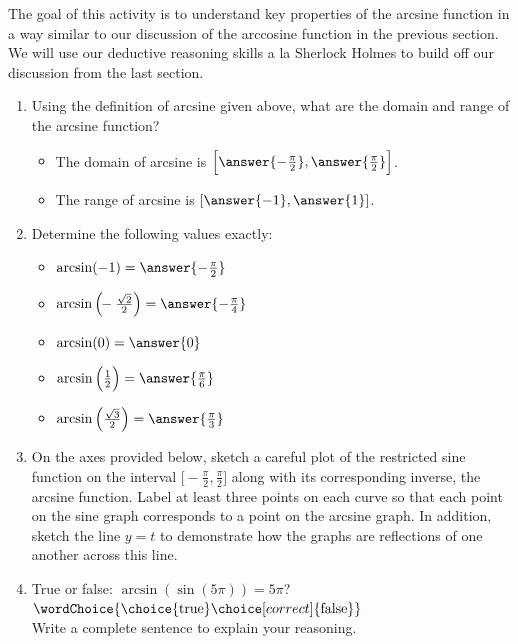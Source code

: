 \documentclass{ximera}
\begin{document}
\begin{problem}
The goal of this activity is to understand key properties of the arcsine function in a way similar to our discussion of the arccosine function in the previous section. We will use our deductive reasoning skills a la Sherlock Holmes to build off our discussion from the last section.%
\begin{enumerate}
\item
Using the definition of arcsine given above, what are the domain and range of the arcsine function? \\
\begin{itemize}
\item The domain of arcsine is $\Big[\answer{-\frac{\pi}{2}},\answer{\frac{\pi}{2}}\Big]$.
%
\item The range of arcsine is $[\answer{-1} , \answer{1}]$.
\end{itemize}
%
\item Determine the following values exactly: 
\begin{itemize}
\item $\arcsin(-1) = \answer{-\frac{\pi}{2}}$ 
%
\item $\arcsin\Big(\!\!-\frac{\sqrt{2}}{2}\Big) = \answer{-\frac{\pi}{4}}$
%
\item $\arcsin(0) = \answer{0}$
%
\item $\arcsin\Big(\frac{1}{2}\Big) = \answer{\frac{\pi}{6}}$
%
\item $\arcsin\Big(\frac{\sqrt{3}}{2}\Big) = \answer{\frac{\pi}{3}}$
\end{itemize}
%
\item
On the axes provided below, sketch a careful plot of the restricted sine function on the interval $\Big[\!\!-\!\frac{\pi}{2},\frac{\pi}{2}\Big]$ along with its corresponding inverse, the arcsine function.  Label at least three points on each curve so that each point on the sine graph corresponds to a point on the arcsine graph.  In addition, sketch the line $y = t$ to demonstrate how the graphs are reflections of one another across this line.
%
%
\item True or false: $\arcsin(\sin(5\pi)) = 5\pi$? $\wordChoice{\choice{\text{true}}\choice[correct]{\text{false}}}$ \\
Write a complete sentence to explain your reasoning.%
\end{enumerate}

\end{problem}
\end{document}
